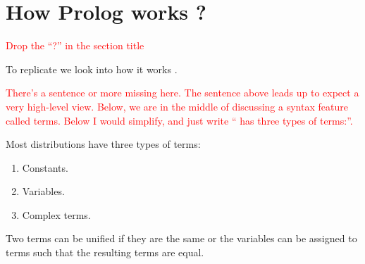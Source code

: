 \documentclass[thesis-solanki.tex]{subfiles}
\begin{document}
\section{How Prolog works ?}

\textcolor{red}{Drop the ``?'' in the section title}

To replicate  we look into how it works \cite{webiste:learnprolognow}.

\textcolor{red}{There's a sentence or more missing here. The sentence above leads up to expect a very
  high-level view.  Below, we are in the middle of discussing a syntax feature called terms.
  Below I would simplify, and just write `` has three types of terms:''.
}

Most  distributions have three types of terms:
\begin{enumerate}
\item Constants.

\item Variables.

\item Complex terms.
\end{enumerate}

Two terms can be unified if they are the same or the variables can be assigned to terms such that the resulting terms are equal.
\end{document}
